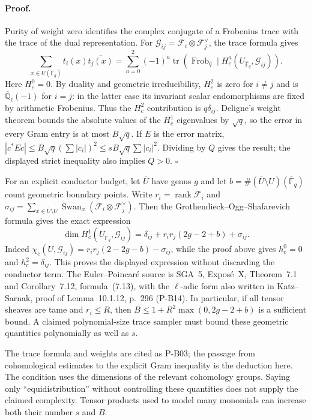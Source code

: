 \paragraph{Proof.}
Purity of weight zero identifies the complex conjugate of a Frobenius trace with the trace of the dual representation. For $\mathcal G_{ij}=\mathcal F_i\otimes\mathcal F_j^\vee$, the trace formula gives
\[
 \sum_{x\in U(\mathbb F_q)}t_i(x)\overline{t_j(x)}
 =\sum_{a=0}^2(-1)^a\operatorname{tr}(\operatorname{Frob}_q\mid H_c^a(U_{\bar{\mathbb F}_q},\mathcal G_{ij})).
\]
Here $H_c^0=0$. By duality and geometric irreducibility, $H_c^2$ is zero for $i\ne j$ and is $\overline{\mathbb Q}_\ell(-1)$ for $i=j$: in the latter case its invariant scalar endomorphisms are fixed by arithmetic Frobenius. Thus the $H_c^2$ contribution is $q\delta_{ij}$. Deligne's weight theorem bounds the absolute values of the $H_c^1$ eigenvalues by $\sqrt q$, so the error in every Gram entry is at most $B\sqrt q$. If $E$ is the error matrix, $|c^*Ec|\le B\sqrt q(\sum|c_i|)^2\le sB\sqrt q\sum|c_i|^2$. Dividing by $Q$ gives the result; the displayed strict inequality also implies $Q>0$. $\square$

For an explicit conductor budget, let $\overline U$ have genus $g$ and let $b=\#(\overline U\setminus U)(\overline{\mathbb F}_q)$ count geometric boundary points. Write $r_i=\operatorname{rank}\mathcal F_i$ and $\sigma_{ij}=\sum_{x\in\overline U\setminus U}\operatorname{Swan}_x(\mathcal F_i\otimes\mathcal F_j^\vee)$. Then the Grothendieck--Ogg--Shafarevich formula gives the exact expression
\[
 \dim H_c^1(U_{\bar{\mathbb F}_q},\mathcal G_{ij})
 =\delta_{ij}+r_ir_j(2g-2+b)+\sigma_{ij}.
\]
Indeed $\chi_c(U,\mathcal G_{ij})=r_ir_j(2-2g-b)-\sigma_{ij}$, while the proof above gives $h_c^0=0$ and $h_c^2=\delta_{ij}$. This proves the displayed expression without discarding the conductor term. The Euler--Poincar\'e source is SGA~5, Expos\'e~X, Theorem~7.1 and Corollary~7.12, formula~(7.13), with the $\ell$-adic form also written in Katz--Sarnak, proof of Lemma~10.1.12, p.~296 (P-B14). In particular, if all tensor sheaves are tame and $r_i\le R$, then $B\le1+R^2\max(0,2g-2+b)$ is a sufficient bound. A claimed polynomial-size trace sampler must bound these geometric quantities polynomially as well as $s$.

The trace formula and weights are cited as P-B03; the passage from cohomological estimates to the explicit Gram inequality is the deduction here. The condition uses the dimensions of the relevant cohomology groups. Saying only ``equidistribution'' without controlling these quantities does not supply the claimed complexity. Tensor products used to model many monomials can increase both their number $s$ and $B$.

